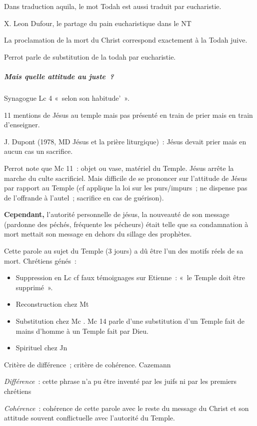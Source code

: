 Dans traduction aquila, le mot Todah est aussi traduit par eucharistie.

X. Leon Dufour, le partage du pain eucharistique dans le NT

La proclamation de la mort du Christ correspond exactement à la Todah
juive.

Perrot parle de substitution de la todah par
eucharistie.

\hypertarget{b.-mais-quelle-attitude-au-juste}{%
\subparagraph{Mais quelle attitude au
juste~?}\label{b.-mais-quelle-attitude-au-juste}}

Synagogue Lc 4 «~selon son habitude'~».

11 mentions de Jésus au temple mais pas présenté en train de prier mais
en train d'enseigner.

J. Dupont (1978, MD Jésus et la prière liturgique)~: Jésus devait prier
mais en aucun cas un sacrifice.

Perrot note que Mc 11~: objet ou vase, matériel du Temple. Jésus arrête
la marche du culte sacrificiel. Mais difficile de se prononcer sur
l'attitude de Jésus par rapport au Temple (cf applique la loi sur les
purs/impurs~; ne dispense pas de l'offrande à l'autel~; sacrifice en cas
de guérison).

\textbf{Cependant,} l'autorité personnelle de jésus, la nouveauté de son
message (pardonne des péchés, fréquente les pécheurs) était telle que sa
condamnation à mort mettait son message en dehors du sillage des
prophètes.

Cette parole au sujet du Temple (3 jours) a dû être l'un des motifs
réels de sa mort. Chrétiens génés~:

\begin{itemize}
\item
  Suppression en Lc cf faux témoignages sur Etienne~: «~le Temple doit
  être supprimé~».
\item
  Reconstruction chez Mt
\item
  Substitution chez Mc . Mc 14 parle d'une substitution d'un Temple fait
  de mains d'homme à un Temple fait par Dieu.
\item
  Spirituel chez Jn
\end{itemize}

Critère de différence~; critère de cohérence. Cazemann

\emph{Différence}~: cette phrase n'a pu être inventé par les juifs ni
par les premiers chrétiens

\emph{Cohérence}~: cohérence de cette parole avec le reste du message du
Christ et son attitude souvent conflictuelle avec l'autorité du Temple.

